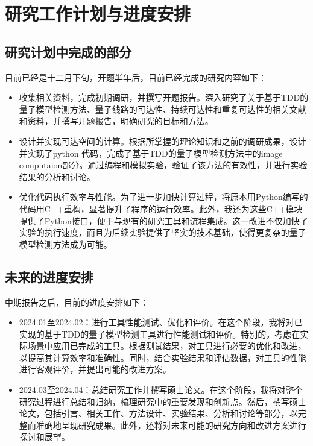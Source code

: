 \chapter{研究工作计划与进度安排}
\section{研究计划中完成的部分}
目前已经是十二月下旬，开题半年后，目前已经完成的研究内容如下：
\begin{itemize}
    \item 收集相关资料，完成初期调研，并撰写开题报告。深入研究了关于基于TDD的量子模型检测方法、量子线路的可达性、持续可达性和重复可达性的相关文献和资料，并撰写开题报告，明确研究的目标和方法。
    \item 设计并实现可达空间的计算。根据所掌握的理论知识和之前的调研成果，设计并实现了python 代码，完成了基于TDD的量子模型检测方法中的image computaion部分。通过编程和模拟实验，验证了该方法的有效性，并进行实验结果的分析和讨论。
    \item 优化代码执行效率与性能。为了进一步加快计算过程，将原本用Python编写的代码用C++重构，显著提升了程序的运行效率。此外，我还为这些C++模块提供了Python接口，便于与现有的研究工具和流程集成。这一改进不仅加快了实验的执行速度，而且为后续实验提供了坚实的技术基础，使得更复杂的量子模型检测方法成为可能。
\end{itemize}
\section{未来的进度安排}
中期报告之后，目前的进度安排如下： 
\begin{itemize}
    \item 2024.01至2024.02：进行工具性能测试、优化和评价。在这个阶段，我将对已实现的基于TDD的量子模型检测工具进行性能测试和评价。特别的，考虑在实际场景中应用已完成的工具。根据测试结果，对工具进行必要的优化和改进，以提高其计算效率和准确性。同时，结合实验结果和评估数据，对工具的性能进行客观评价，并提出可能的改进方案。
    \item 2024.03至2024.04：总结研究工作并撰写硕士论文。在这个阶段，我将对整个研究过程进行总结和归纳，梳理研究中的重要发现和创新点。然后，撰写硕士论文，包括引言、相关工作、方法设计、实验结果、分析和讨论等部分，以完整而准确地呈现研究成果。此外，还将对未来可能的研究方向和改进方案进行探讨和展望。
\end{itemize}

